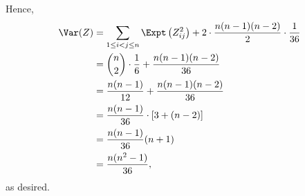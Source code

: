 \begin{enumerate}
          Hence,
          \begin{align*}
              \Var(Z) & = \sum_{1 \leq i < j \leq n} \Expt \left(Z_{ij}^2\right) + 2 \cdot \frac{n (n - 1) (n - 2)}{2} \cdot \frac{1}{36} \\
                      & = \binom{n}{2} \cdot \frac{1}{6} + \frac{n (n - 1) (n - 2)}{36}                                                   \\
                      & = \frac{n (n - 1)}{12} + \frac{n (n - 1) (n - 2)}{36}                                                             \\
                      & = \frac{n (n - 1)}{36} \cdot \left[3 + (n - 2)\right]                                                             \\
                      & = \frac{n (n - 1)}{36} (n + 1)                                                                                    \\
                      & = \frac{n (n^2 - 1)}{36},
          \end{align*}
          as desired.
\end{enumerate}